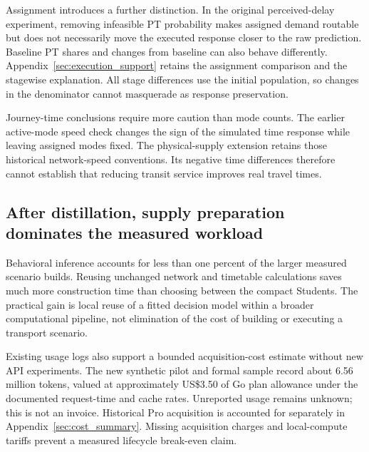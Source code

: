 Assignment introduces a further distinction. In the original perceived-delay experiment, removing infeasible PT probability makes assigned demand routable but does not necessarily move the executed response closer to the raw prediction. Baseline PT shares and changes from baseline can also behave differently. Appendix~\ref{sec:execution_support} retains the assignment comparison and the stagewise explanation. All stage differences use the initial population, so changes in the denominator cannot masquerade as response preservation.

Journey-time conclusions require more caution than mode counts. The earlier active-mode speed check changes the sign of the simulated time response while leaving assigned modes fixed. The physical-supply extension retains those historical network-speed conventions. Its negative time differences therefore cannot establish that reducing transit service improves real travel times.

\FloatBarrier
\subsection{After distillation, supply preparation dominates the measured workload}
Behavioral inference accounts for less than one percent of the larger measured scenario builds. Reusing unchanged network and timetable calculations saves much more construction time than choosing between the compact Students. The practical gain is local reuse of a fitted decision model within a broader computational pipeline, not elimination of the cost of building or executing a transport scenario.

Existing usage logs also support a bounded acquisition-cost estimate without new API experiments. The new synthetic pilot and formal sample record about 6.56 million tokens, valued at approximately US\$3.50 of Go plan allowance under the documented request-time and cache rates. Unreported usage remains unknown; this is not an invoice. Historical Pro acquisition is accounted for separately in Appendix~\ref{sec:cost_summary}. Missing acquisition charges and local-compute tariffs prevent a measured lifecycle break-even claim.
